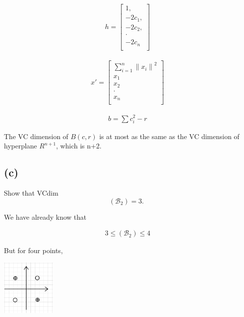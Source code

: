 \documentclass{article}
\begin{document}
\begin{align}
    h = 
    \begin{bmatrix}
        1,      \\
        -2c_{1},\\
        -2c_{2},\\
        \cdot   \\
        -2c_{n} \\
    \end{bmatrix}
\end{align}


\begin{align}
    x' =
    \begin{bmatrix}
        \sum_{i=1}^{n} {\|x_{i}\|}^2 \\
        x_{1} \\
        x_{2} \\
        \cdot \\
        x_{n} \\
    \end{bmatrix}
\end{align}


\begin{align}
    b = \sum c_{i}^{2} - r
\end{align}

The VC dimension of $B(c, r)$ is at most as the same as the VC dimension of hyperplane $R^{n+1}$, which is n+2.


\subsection*{(c)}
Show that VCdim 
\begin{equation}
    \left(\mathcal{B}_{2}\right)=3 \text {. }
\end{equation}

We have already know that 

\begin{align}
    3 \leq \left(\mathcal{B}_{2}\right) \leq 4
\end{align}

But for four points, 

\begin{center}
    \includegraphics[width=100px]{./images/1_1.png}
\end{center}
\end{document}
